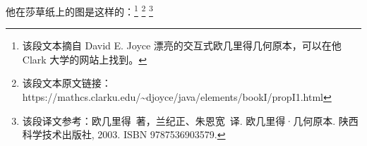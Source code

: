 \bohs

他在莎草纸上的图是这样的：\footnote{该段文本摘自 David E. Joyce 漂亮的交互式欧几里得几何原本，可以在他 Clark 大学的网站上找到。}
\footnote{{\color{blue} 该段文本原文链接：https://mathcs.clarku.edu/\textasciitilde{}djoyce/java/elements/bookI/propI1.html}}
\footnote{{\color{blue} 该段译文参考：欧几里得\ 著，兰纪正、朱恩宽\ 译. 欧几里得·几何原本. 陕西科学技术出版社, 2003. ISBN 9787536903579.}}

\eohs



